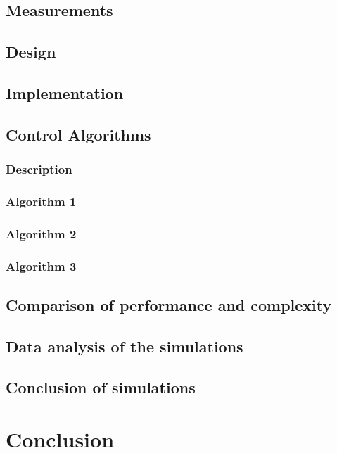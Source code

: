 \documentclass[A4,openany,12pt]{article}
\begin{document}
\subsection{Measurements}
%

\subsection{Design}
%

\subsection{Implementation}
%

\subsection{Control Algorithms}
%

\subsubsection{Description}\label{description}
%

\subsubsection{Algorithm 1}
%

\subsubsection{Algorithm 2}
%

\subsubsection{Algorithm 3}
%

\subsection{Comparison of performance and complexity}
%

\subsection{Data analysis of the simulations}
%

\subsection{Conclusion of simulations}
%

\section{Conclusion}
%

\printnomenclature
\nocite{*}
{} 

\end{document}
